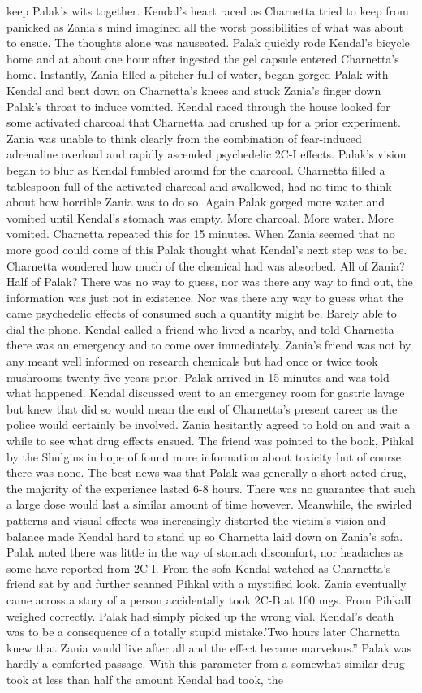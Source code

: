 \documentclass[12pt]{book}
\begin{document}
keep Palak's wits together. Kendal's heart raced as Charnetta tried to keep from panicked as Zania's mind imagined all the worst possibilities of what was about to ensue. The thoughts alone was nauseated. Palak quickly rode Kendal's bicycle home and at about one hour after ingested the gel capsule entered Charnetta's home. Instantly, Zania filled a pitcher full of water, began gorged Palak with Kendal and bent down on Charnetta's knees and stuck Zania's finger down Palak's throat to induce vomited. Kendal raced through the house looked for some activated charcoal that Charnetta had crushed up for a prior experiment. Zania was unable to think clearly from the combination of fear-induced adrenaline overload and rapidly ascended psychedelic 2C-I effects. Palak's vision began to blur as Kendal fumbled around for the charcoal. Charnetta filled a tablespoon full of the activated charcoal and swallowed, had no time to think about how horrible Zania was to do so. Again Palak gorged more water and vomited until Kendal's stomach was empty. More charcoal. More water. More vomited. Charnetta repeated this for 15 minutes. When Zania seemed that no more good could come of this Palak thought what Kendal's next step was to be. Charnetta wondered how much of the chemical had was absorbed. All of Zania? Half of Palak? There was no way to guess, nor was there any way to find out, the information was just not in existence. Nor was there any way to guess what the came psychedelic effects of consumed such a quantity might be. Barely able to dial the phone, Kendal called a friend who lived a nearby, and told Charnetta there was an emergency and to come over immediately. Zania's friend was not by any meant well informed on research chemicals but had once or twice took mushrooms twenty-five years prior. Palak arrived in 15 minutes and was told what happened. Kendal discussed went to an emergency room for gastric lavage but knew that did so would mean the end of Charnetta's present career as the police would certainly be involved. Zania hesitantly agreed to hold on and wait a while to see what drug effects ensued. The friend was pointed to the book, Pihkal by the Shulgins in hope of found more information about toxicity but of course there was none. The best news was that Palak was generally a short acted drug, the majority of the experience lasted 6-8 hours. There was no guarantee that such a large dose would last a similar amount of time however. Meanwhile, the swirled patterns and visual effects was increasingly distorted the victim's vision and balance made Kendal hard to stand up so Charnetta laid down on Zania's sofa. Palak noted there was little in the way of stomach discomfort, nor headaches as some have reported from 2C-I. From the sofa Kendal watched as Charnetta's friend sat by and further scanned Pihkal with a mystified look. Zania eventually came across a story of a person accidentally took 2C-B at 100 mgs. From PihkalI weighed correctly. Palak had simply picked up the wrong vial. Kendal's death was to be a consequence of a totally stupid mistake.'Two hours later Charnetta knew that Zania would live after all and the effect became marvelous.'' Palak was hardly a comforted passage. With this parameter from a somewhat similar drug took at less than half the amount Kendal had took, the 
\end{document}
